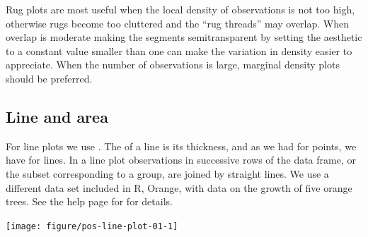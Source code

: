 \documentclass[krantz2]{krantz}\usepackage{knitr}%
\begin{document}
\begin{warningbox}
  Rug plots are most useful when the local density of observations is not too high, otherwise rugs become too cluttered and the ``rug threads'' may overlap. When overlap is moderate making the segments semitransparent by setting the  aesthetic to a constant value smaller than one can make the variation in density easier to appreciate. When the number of observations is large, marginal density plots should be preferred.
\end{warningbox}

\subsection{Line and area}\label{sec:plot:line}

For line plots we use . The  of a line is its thickness, and as we had  for points, we have  for lines. In a line plot observations in successive rows of the data frame, or the subset corresponding to a group, are joined by straight lines. We use a different data set included in R, Orange, with data on the growth of five orange trees. See the help page for  for details.

\label{plot:fig:lines}
\begin{knitrout}\footnotesize
{}\color{fgcolor}\begin{kframe}
\begin{alltt}
\hlstd{(} 
       \hlstd{(}      \hlopt{+}
  \hlstd{()}
\end{alltt}
\end{kframe}

{\centering \texttt{[image: figure/pos-line-plot-01-1]} 

}



\end{knitrout}
\end{document}
